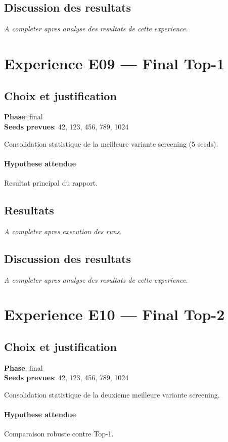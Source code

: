 \documentclass[11pt,a4paper]{article}
\begin{document}
\subsection{Discussion des resultats}
\textit{A completer apres analyse des resultats de cette experience.}


\section{Experience E09 --- Final Top-1}
\subsection{Choix et justification}
\textbf{Phase}: final\\
\textbf{Seeds prevues}: 42, 123, 456, 789, 1024

Consolidation statistique de la meilleure variante screening (5 seeds).

\paragraph{Hypothese attendue}
Resultat principal du rapport.

\subsection{Resultats}
\textit{A completer apres execution des runs.}

\subsection{Discussion des resultats}
\textit{A completer apres analyse des resultats de cette experience.}


\section{Experience E10 --- Final Top-2}
\subsection{Choix et justification}
\textbf{Phase}: final\\
\textbf{Seeds prevues}: 42, 123, 456, 789, 1024

Consolidation statistique de la deuxieme meilleure variante screening.

\paragraph{Hypothese attendue}
Comparaison robuste contre Top-1.
\end{document}
